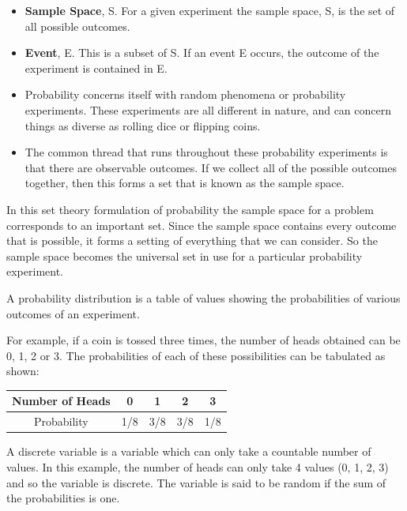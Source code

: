 \documentclass[12pt]{report}
\begin{document}
{ \Large
	\begin{itemize}
		\item \textbf{Sample Space}, S. For a given experiment the sample space, S, is the set of all
		possible outcomes.
		\item \textbf{Event}, E. This is a subset of S. If an event E occurs, the outcome of the experiment is contained in E.
	\end{itemize}
	
}
{ \Large
	\begin{itemize}
		\item Probability concerns itself with random phenomena or probability experiments. These experiments are all different in nature, and can concern things as diverse as rolling dice or flipping coins. 
		\item The common thread that runs throughout these probability experiments is that there are observable outcomes. If we collect all of the possible outcomes together, then this forms a set that is known as the sample space.
		
	\end{itemize}
	
	
}
{ \Large
	In this set theory formulation of probability the sample space for a problem corresponds to an important set. Since the sample space contains every outcome that is possible, it forms a setting of everything that we can consider. So the sample space becomes the universal set in use for a particular probability experiment.
	
	A probability distribution is a table of values showing the probabilities of various outcomes of an experiment.
	
	
}
{ \Large
	For example, if a coin is tossed three times, the number of heads obtained can be 0, 1, 2 or 3. The probabilities of each of these possibilities can be tabulated as shown:
	
	\begin{tabular}{|c|c|c|c|c|}
		\hline Number of Heads & 0 & 1 & 2 & 3 \\ 
		\hline Probability & 1/8  & 3/8  & 3/8 & 1/8 \\ 
		\hline 
	\end{tabular} 
	
	A discrete variable is a variable which can only take a countable number of values. In this example, the number of heads can only take 4 values (0, 1, 2, 3) and so the variable is discrete. The variable is said to be random if the sum of the probabilities is one. 
	
	
}
\end{document}
